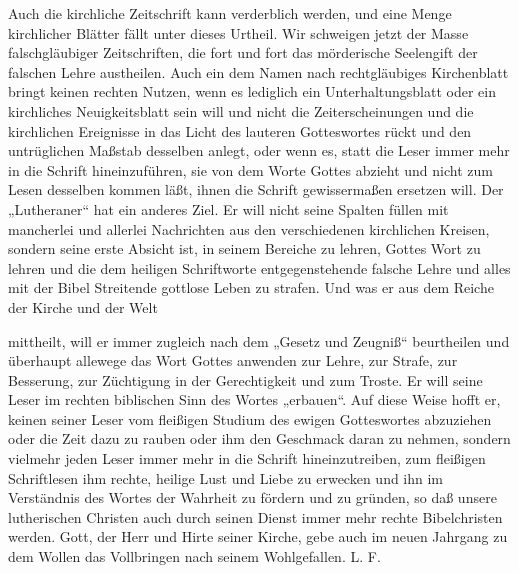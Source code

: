 Auch die kirchliche Zeitschrift kann verderblich werden, und eine Menge kirchlicher Blätter fällt unter dieses Urtheil. Wir schweigen jetzt der Masse falschgläubiger Zeitschriften, die fort und fort das mörderische Seelengift der falschen Lehre austheilen. Auch ein dem Namen nach rechtgläubiges Kirchenblatt bringt keinen rechten Nutzen, wenn es lediglich ein Unterhaltungsblatt oder ein kirchliches Neuigkeitsblatt sein will und nicht die Zeiterscheinungen und die kirchlichen Ereignisse in das Licht des lauteren Gotteswortes rückt und den untrüglichen Maßstab desselben anlegt, oder wenn es, statt die Leser immer mehr in die Schrift hineinzuführen, sie von dem Worte Gottes abzieht und nicht zum Lesen desselben kommen läßt, ihnen die Schrift gewissermaßen ersetzen will. Der „Lutheraner“ hat ein anderes Ziel. Er will nicht seine Spalten füllen mit mancherlei und allerlei Nachrichten aus den verschiedenen kirchlichen Kreisen, sondern seine erste Absicht ist, in seinem Bereiche zu lehren, Gottes Wort zu lehren und die dem heiligen Schriftworte entgegenstehende falsche Lehre und alles mit der Bibel Streitende gottlose Leben zu strafen. Und was er aus dem Reiche der Kirche und der Welt

mittheilt, will er immer zugleich nach dem „Gesetz und Zeugniß“ beurtheilen und überhaupt allewege das Wort Gottes anwenden zur Lehre, zur Strafe, zur Besserung, zur Züchtigung in der Gerechtigkeit und zum Troste. Er will seine Leser im rechten biblischen Sinn des Wortes „erbauen“. Auf diese Weise hofft er, keinen seiner Leser vom fleißigen Studium des ewigen Gotteswortes abzuziehen oder die Zeit dazu zu rauben oder ihm den Geschmack daran zu nehmen, sondern vielmehr jeden Leser immer mehr in die Schrift hineinzutreiben, zum fleißigen Schriftlesen ihm rechte, heilige Lust und Liebe zu erwecken und ihn im Verständnis des Wortes der Wahrheit zu fördern und zu gründen, so daß unsere lutherischen Christen auch durch seinen Dienst immer mehr rechte Bibelchristen werden. Gott, der Herr und Hirte seiner Kirche, gebe auch im neuen Jahrgang zu dem Wollen das Vollbringen nach seinem Wohlgefallen. L. F.
